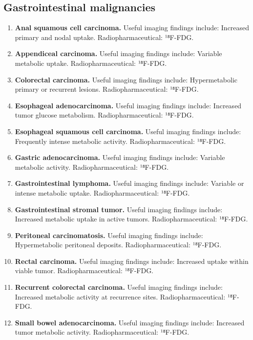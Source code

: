 \subsection{Gastrointestinal malignancies}
\begin{enumerate}[leftmargin=*,itemsep=0.45em,topsep=0.4em]
\item \textbf{Anal squamous cell carcinoma.} Useful imaging findings include: Increased primary and nodal uptake. Radiopharmaceutical: ¹⁸F-FDG.
\item \textbf{Appendiceal carcinoma.} Useful imaging findings include: Variable metabolic uptake. Radiopharmaceutical: ¹⁸F-FDG.
\item \textbf{Colorectal carcinoma.} Useful imaging findings include: Hypermetabolic primary or recurrent lesions. Radiopharmaceutical: ¹⁸F-FDG.
\item \textbf{Esophageal adenocarcinoma.} Useful imaging findings include: Increased tumor glucose metabolism. Radiopharmaceutical: ¹⁸F-FDG.
\item \textbf{Esophageal squamous cell carcinoma.} Useful imaging findings include: Frequently intense metabolic activity. Radiopharmaceutical: ¹⁸F-FDG.
\item \textbf{Gastric adenocarcinoma.} Useful imaging findings include: Variable metabolic activity. Radiopharmaceutical: ¹⁸F-FDG.
\item \textbf{Gastrointestinal lymphoma.} Useful imaging findings include: Variable or intense metabolic uptake. Radiopharmaceutical: ¹⁸F-FDG.
\item \textbf{Gastrointestinal stromal tumor.} Useful imaging findings include: Increased metabolic uptake in active tumors. Radiopharmaceutical: ¹⁸F-FDG.
\item \textbf{Peritoneal carcinomatosis.} Useful imaging findings include: Hypermetabolic peritoneal deposits. Radiopharmaceutical: ¹⁸F-FDG.
\item \textbf{Rectal carcinoma.} Useful imaging findings include: Increased uptake within viable tumor. Radiopharmaceutical: ¹⁸F-FDG.
\item \textbf{Recurrent colorectal carcinoma.} Useful imaging findings include: Increased metabolic activity at recurrence sites. Radiopharmaceutical: ¹⁸F-FDG.
\item \textbf{Small bowel adenocarcinoma.} Useful imaging findings include: Increased tumor metabolic activity. Radiopharmaceutical: ¹⁸F-FDG.
\end{enumerate}

